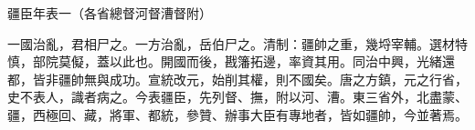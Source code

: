 
\begin{pinyinscope}
疆臣年表一（各省總督河督漕督附）

一國治亂，君相尸之。一方治亂，岳伯尸之。清制：疆帥之重，幾埒宰輔。選材特慎，部院莫儗，蓋以此也。開國而後，戡籓拓邊，率資其用。同治中興，光緒還都，皆非疆帥無與成功。宣統改元，始削其權，則不國矣。唐之方鎮，元之行省，史不表人，識者病之。今表疆臣，先列督、撫，附以河、漕。東三省外，北盡蒙、疆，西極回、藏，將軍、都統，參贊、辦事大臣有專地者，皆如疆帥，今並著焉。


\end{pinyinscope}